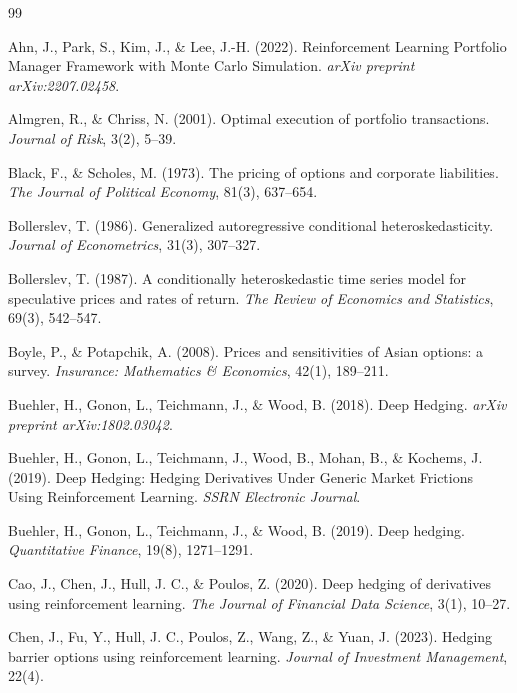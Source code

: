 \documentclass[11pt,a4paper,spanish]{article}
\numberwithin{equation}{section} %
\begin{document}
\newpage

\begin{thebibliography}{99}

 Ahn, J., Park, S., Kim, J., \& Lee, J.-H. (2022). Reinforcement Learning Portfolio Manager Framework with Monte Carlo Simulation. \textit{arXiv preprint arXiv:2207.02458}.

 Almgren, R., \& Chriss, N. (2001). Optimal execution of portfolio transactions. \textit{Journal of Risk}, 3(2), 5--39.

 Black, F., \& Scholes, M. (1973). The pricing of options and corporate liabilities. \textit{The Journal of Political Economy}, 81(3), 637--654.

 Bollerslev, T. (1986). Generalized autoregressive conditional heteroskedasticity. \textit{Journal of Econometrics}, 31(3), 307--327.

 Bollerslev, T. (1987). A conditionally heteroskedastic time series model for speculative prices and rates of return. \textit{The Review of Economics and Statistics}, 69(3), 542--547.

 Boyle, P., \& Potapchik, A. (2008). Prices and sensitivities of Asian options: a survey. \textit{Insurance: Mathematics \& Economics}, 42(1), 189--211.

Buehler, H., Gonon, L., Teichmann, J., \& Wood, B. (2018). Deep Hedging. \textit{arXiv preprint arXiv:1802.03042}.

Buehler, H., Gonon, L., Teichmann, J., Wood, B., Mohan, B., \& Kochems, J. (2019). Deep Hedging: Hedging Derivatives Under Generic Market Frictions Using Reinforcement Learning. \textit{SSRN Electronic Journal}.

 Buehler, H., Gonon, L., Teichmann, J., \& Wood, B. (2019). Deep hedging. \textit{Quantitative Finance}, 19(8), 1271--1291.

 Cao, J., Chen, J., Hull, J. C., \& Poulos, Z. (2020). Deep hedging of derivatives using reinforcement learning. \textit{The Journal of Financial Data Science}, 3(1), 10--27.

 Chen, J., Fu, Y., Hull, J. C., Poulos, Z., Wang, Z., \& Yuan, J. (2023). Hedging barrier options using reinforcement learning. \textit{Journal of Investment Management}, 22(4).


\end{thebibliography}
\end{document}
